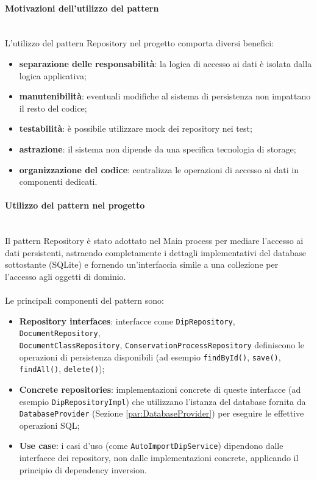 \documentclass[a4paper,12pt]{article}
\begin{document}
{{{                \paragraph{Motivazioni dell’utilizzo del pattern}\mbox{}\\
                L’utilizzo del pattern Repository nel progetto comporta diversi benefici:
                \begin{itemize}
                    \item \textbf{separazione delle responsabilità}: la logica di accesso ai dati è isolata dalla logica applicativa;
                    \item \textbf{manutenibilità}: eventuali modifiche al sistema di persistenza non impattano il resto del codice;
                    \item \textbf{testabilità}: è possibile utilizzare mock dei repository nei test;
                    \item \textbf{astrazione}: il sistema non dipende da una specifica tecnologia di storage;
                    \item \textbf{organizzazione del codice}: centralizza le operazioni di accesso ai dati in componenti dedicati.
                \end{itemize}
                
                \paragraph{ Utilizzo del pattern nel progetto}\mbox{}\\
                Il pattern Repository è stato adottato nel Main process per mediare l'accesso ai dati persistenti, astraendo completamente i dettagli implementativi del database sottostante (SQLite) e fornendo un'interfaccia simile a una collezione per l'accesso agli oggetti di dominio.\\
                \\
                Le principali componenti del pattern sono:
                \begin{itemize}
                    \item \textbf{Repository interfaces}: interfacce come \texttt{DipRepository}, \texttt{DocumentRepository},\\ \texttt{DocumentClassRepository}, \texttt{ConservationProcessRepository} definiscono le operazioni di persistenza disponibili (ad esempio \texttt{findById()}, \texttt{save()}, \texttt{findAll()}, \texttt{delete()});
                    \item \textbf{Concrete repositories}: implementazioni concrete di queste interfacce (ad esempio \texttt{DipRepositoryImpl}) che utilizzano l'istanza del database fornita da \texttt{DatabaseProvider} (Sezione \ref{par:DatabaseProvider}) per eseguire le effettive operazioni SQL;
                    \item \textbf{Use case}: i casi d'uso (come \texttt{AutoImportDipService}) dipendono dalle interfacce dei repository, non dalle implementazioni concrete, applicando il principio di dependency inversion.
                \end{itemize}
                
}}}
\end{document}
